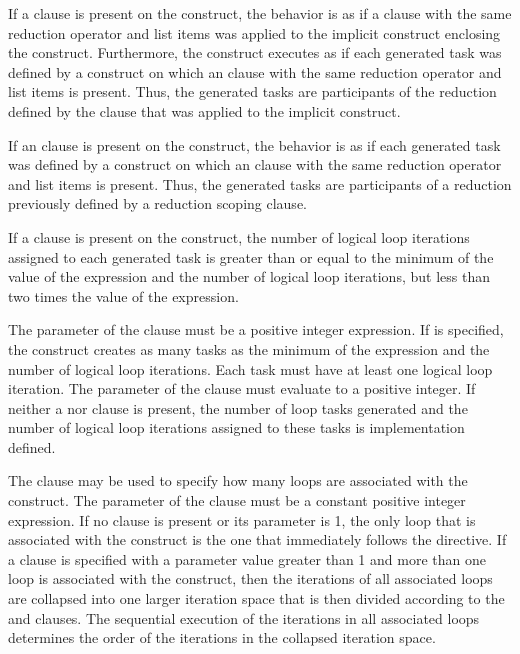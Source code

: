 If a  clause is present on the  construct, the behavior is as if a  clause with the same reduction operator and list items was applied to the implicit  construct enclosing the  construct.
Furthermore, the  construct executes as if each generated task was defined by a  construct on which an  clause with the same reduction operator and list items is present. Thus, the generated tasks are participants of the reduction defined by the  clause that was applied to the implicit  construct.

If an  clause is present on the  construct, the behavior is as if each generated task was defined by a  construct on which an  clause with the same reduction operator and list items is present. Thus, the generated tasks are participants of a reduction previously defined by a reduction scoping clause.

If a  clause is present on the  construct, the number of logical loop iterations assigned to each generated task is greater than or equal to the minimum of the value of the  expression and the number of logical loop iterations, but less than two times the value of the  expression.

The parameter of the  clause must be a positive integer expression.
If  is specified, the  construct creates as many tasks as the minimum of the  expression and the number of logical loop iterations.
Each task must have at least one logical loop iteration.
The parameter of the  clause must evaluate to a positive integer.
If neither a  nor  clause is present, the number of loop tasks generated and the number of logical loop iterations assigned to these tasks is implementation defined.

The  clause may be used to specify how many loops are
associated with the  construct.  The parameter of the
 clause must be a constant positive integer
expression.  If no  clause is present or its parameter
is 1, the only loop that is associated with the 
construct is the one that immediately follows the 
directive.  If a  clause is specified with a parameter
value greater than 1 and more than one loop is associated with the
 construct, then the iterations of all associated loops
are collapsed into one larger iteration space that is then divided
according to the  and  clauses. The
sequential execution of the iterations in all associated loops
determines the order of the iterations in the collapsed iteration
space.

